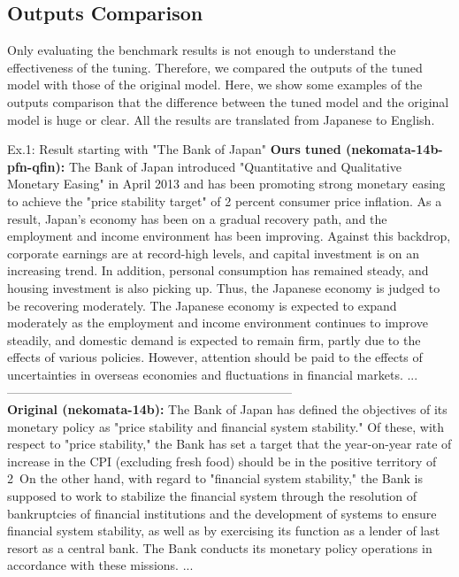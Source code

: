 \subsection{Outputs Comparison}
Only evaluating the benchmark results is not enough to understand the effectiveness of the tuning.
Therefore, we compared the outputs of the tuned model with those of the original model.
Here, we show some examples of the outputs comparison that the difference between the tuned model and the original model is huge or clear.
All the results are translated from Japanese to English.

\begin{brekableitembox}{Ex.1: Result starting with "The Bank of Japan"}
    {\bf Ours tuned (nekomata-14b-pfn-qfin):}
    The Bank of Japan introduced "Quantitative and Qualitative Monetary Easing" in April 2013 and has been promoting strong monetary easing to achieve the "price stability target" of 2 percent consumer price inflation. As a result, Japan's economy has been on a gradual recovery path, and the employment and income environment has been improving.
    Against this backdrop, corporate earnings are at record-high levels, and capital investment is on an increasing trend. In addition, personal consumption has remained steady, and housing investment is also picking up. Thus, the Japanese economy is judged to be recovering moderately.
    The Japanese economy is expected to expand moderately as the employment and income environment continues to improve steadily, and domestic demand is expected to remain firm, partly due to the effects of various policies. However, attention should be paid to the effects of uncertainties in overseas economies and fluctuations in financial markets. ...\\
    ---------------------------------------------------------------------\\
    {\bf Original (nekomata-14b):}
    The Bank of Japan has defined the objectives of its monetary policy as "price stability and financial system stability." Of these, with respect to "price stability," the Bank has set a target that the year-on-year rate of increase in the CPI (excluding fresh food) should be in the positive territory of 2\    On the other hand, with regard to "financial system stability," the Bank is supposed to work to stabilize the financial system through the resolution of bankruptcies of financial institutions and the development of systems to ensure financial system stability, as well as by exercising its function as a lender of last resort as a central bank.
    The Bank conducts its monetary policy operations in accordance with these missions. ...
\end{brekableitembox}

